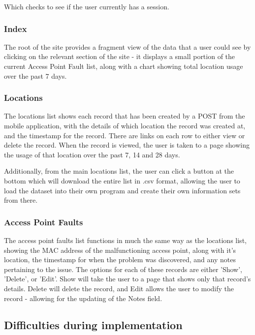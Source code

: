 \documentclass[11pt]{informatics-report}
\begin{document}
Which checks to see if the user currently has a session.

\subsubsection{Index}

The root of the site provides a fragment view of the data that a user could see by clicking on the relevant section of the site - it displays a small portion of the current Access Point Fault list, along with a chart showing total location usage over the past 7 days.

\subsubsection{Locations}

The locations list shows each record that has been created by a POST from the mobile application, with the details of which location the record was created at, and the timestamp for the record. There are links on each row to either view or delete the record. When the record is viewed, the user is taken to a page showing the usage of that location over the past 7, 14 and 28 days. 

Additionally, from the main locations list, the user can click a button at the bottom which will download the entire list in .csv format, allowing the user to load the dataset into their own program and create their own information sets from there.

\subsubsection{Access Point Faults}

The access point faults list functions in much the same way as the locations list, showing the MAC address of the malfunctioning access point, along with it's location, the timestamp for when the problem was discovered, and any notes pertaining to the issue. The options for each of these records are either 'Show', 'Delete', or 'Edit'. Show will take the user to a page that shows only that record's details. Delete will delete the record, and Edit allows the user to modify the record - allowing for the updating of the Notes field. 

\subsection{Difficulties during implementation}
\end{document}
